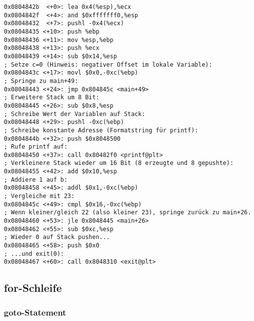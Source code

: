 \begin{lstlisting}[language={[x86masm]Assembler}]
0x0804842b 	<+0>: lea 0x4(%esp),%ecx
0x0804842f 	<+4>: and $0xfffffff0,%esp
0x08048432 	<+7>: pushl -0x4(%ecx)
0x08048435 <+10>: push %ebp
0x08048436 <+11>: mov %esp,%ebp
0x08048438 <+13>: push %ecx
0x08048439 <+14>: sub $0x14,%esp
; Setze c=0 (Hinweis: negativer Offset im lokale Variable):
0x0804843c <+17>: movl $0x0,-0xc(%ebp)
; Springe zu main+49:
0x08048443 <+24>: jmp 0x804845c <main+49>
; Erweitere Stack um 8 Bit:
0x08048445 <+26>: sub $0x8,%esp
; Schreibe Wert der Variablen auf Stack:
0x08048448 <+29>: pushl -0xc(%ebp)
; Schreibe konstante Adresse (Formatstring für printf):
0x0804844b <+32>: push $0x8048500
; Rufe printf auf:
0x08048450 <+37>: call 0x80482f0 <printf@plt>
; Verkleinere Stack wieder um 16 Bit (8 erzeugte und 8 gepushte):
0x08048455 <+42>: add $0x10,%esp
; Addiere 1 auf b:
0x08048458 <+45>: addl $0x1,-0xc(%ebp)
; Vergleiche mit 23: 
0x0804845c <+49>: cmpl $0x16,-0xc(%ebp)
; Wenn kleiner/gleich 22 (also kleiner 23), springe zurück zu main+26.
0x08048460 <+53>: jle 0x8048445 <main+26>
0x08048462 <+55>: sub $0xc,%esp
; Wieder 0 auf Stack pushen...
0x08048465 <+58>: push $0x0
; ...und exit(0):
0x08048467 <+60>: call 0x8048310 <exit@plt>
\end{lstlisting}

\subsection{for-Schleife}
\subsubsection{goto-Statement}

